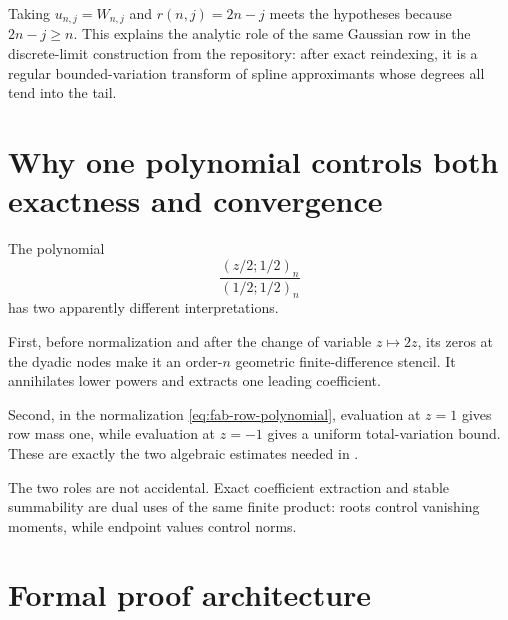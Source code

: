 \documentclass[11pt,oneside,openany]{book}
\theoremstyle{definition}
\theoremstyle{remark}
\begin{document}
Taking $u_{n,j}=W_{n,j}$ and $r(n,j)=2n-j$ meets the hypotheses because $2n-j\ge n$.  This explains the analytic role of the same Gaussian row in the discrete-limit construction from the repository: after exact reindexing, it is a regular bounded-variation transform of spline approximants whose degrees all tend into the tail.

\section{Why one polynomial controls both exactness and convergence}

The polynomial
\begin{equation}
 \frac{(z/2;1/2)_n}{(1/2;1/2)_n}
 \label{eq:fab-master-row-polynomial}
\end{equation}
has two apparently different interpretations.

First, before normalization and after the change of variable $z\mapsto2z$, its zeros at the dyadic nodes make it an order-$n$ geometric finite-difference stencil.  It annihilates lower powers and extracts one leading coefficient.

Second, in the normalization \eqref{eq:fab-row-polynomial}, evaluation at $z=1$ gives row mass one, while evaluation at $z=-1$ gives a uniform total-variation bound.  These are exactly the two algebraic estimates needed in .

The two roles are not accidental.  Exact coefficient extraction and stable summability are dual uses of the same finite product: roots control vanishing moments, while endpoint values control norms.

\section{Formal proof architecture}
\end{document}
